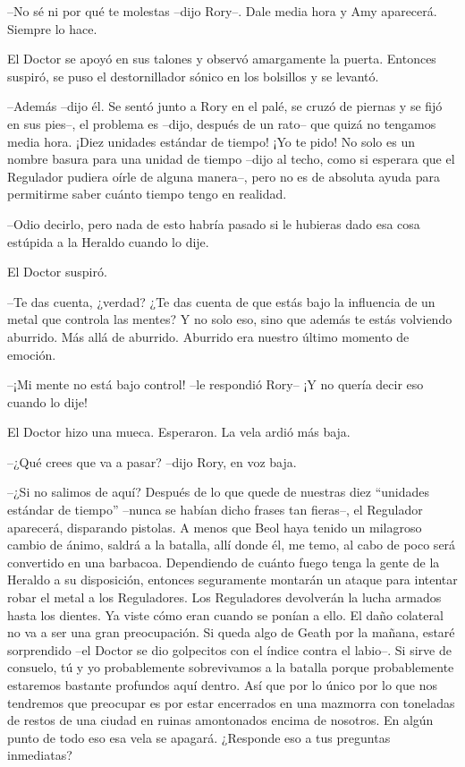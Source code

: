 {--No sé ni por qué te molestas --dijo Rory--. Dale media hora y Amy
aparecerá. Siempre lo hace.}

{El Doctor se apoyó en sus talones y observó amargamente la puerta.
	Entonces suspiró, se puso el destornillador sónico en los bolsillos y se
levantó.}

{--Además --dijo él. Se sentó junto a Rory en el palé, se cruzó de
	piernas y se fijó en sus pies--, el problema es --dijo, después de un
	rato-- que quizá no tengamos media hora. ¡Diez unidades estándar de
	tiempo! ¡Yo te pido! No solo es un nombre basura para una unidad de
	tiempo --dijo al techo, como si esperara que el Regulador pudiera oírle
	de alguna manera--, pero no es de absoluta ayuda para permitirme saber
cuánto tiempo tengo en realidad.}

{--Odio decirlo, pero nada de esto habría pasado si le hubieras dado
esa cosa estúpida a la Heraldo cuando lo dije.}

{El Doctor suspiró.}

{--Te das cuenta, ¿verdad? ¿Te das cuenta de que estás bajo la
	influencia de un metal que controla las mentes? Y no solo eso, sino que
	además te estás volviendo aburrido. Más allá de aburrido. Aburrido era
nuestro último momento de emoción.}

{--¡Mi mente no está bajo control! --le respondió Rory-- ¡Y no quería
decir eso cuando lo dije!}

{El Doctor hizo una mueca. Esperaron. La vela ardió más baja.}

{--¿Qué crees que va a pasar? --dijo Rory, en voz baja.}

{--¿Si no salimos de aquí? Después de lo que quede de nuestras diez
	``unidades estándar de tiempo'' --nunca se habían dicho frases tan
	fieras--, el Regulador aparecerá, disparando pistolas. A menos que Beol
	haya tenido un milagroso cambio de ánimo, saldrá a la batalla, allí
	donde él, me temo, al cabo de poco será convertido en una barbacoa.
	Dependiendo de cuánto fuego tenga la gente de la Heraldo a su
	disposición, entonces seguramente montarán un ataque para intentar robar
	el metal a los Reguladores. Los Reguladores devolverán la lucha armados
	hasta los dientes. Ya viste cómo eran cuando se ponían a ello. El daño
	colateral no va a ser una gran preocupación. Si queda algo de Geath por
	la mañana, estaré sorprendido --el Doctor se dio golpecitos con el
	índice contra el labio--. Si sirve de consuelo, tú y yo probablemente
	sobrevivamos a la batalla porque probablemente estaremos bastante
	profundos aquí dentro. Así que por lo único por lo que nos tendremos que
	preocupar es por estar encerrados en una mazmorra con toneladas de
	restos de una ciudad en ruinas amontonados encima de nosotros. En algún
	punto de todo eso esa vela se apagará. ¿Responde eso a tus preguntas
inmediatas?}

